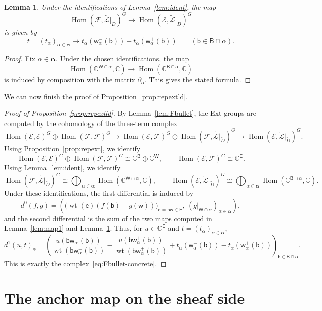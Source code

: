 \documentclass[dvipsnames,11pt]{article}
\newtheorem{lemma}[theorem]{Lemma}
\theoremstyle{definition}
\newcommand{\wt}{\operatorname{wt}}
\newcommand{\C}{{\mathbb C}}
\def\B{\mathsf B}
\def\W{\mathsf W}
\def\w{\mathsf w}
\def\b{\mathsf b}
\def\e{\mathsf e}
\def\E{\mathsf E}
\def\zz{\bm \alpha}
\def\cale{\mathcal E}
\def\calf{\mathcal F}
\DeclareMathOperator{\Hom}{Hom}
\begin{document}
\begin{lemma}\label{lem:map2}
Under the identifications of Lemma~\ref{lem:ident}, the map
\[
\Hom(\calf,\widetilde{\mathcal L}|_{\widetilde D})^G
\rightarrow
\Hom(\cale,\widetilde{\mathcal L}|_{\widetilde D})^G
\]
is given by
\[
t=(t_\alpha)_{\alpha\in\zz}
\mapsto
t_\alpha(\w_\alpha^{-}(\b))-t_\alpha(\w_\alpha^{+}(\b))
\qquad (\b\in\B\cap\alpha).
\]
\end{lemma}

\begin{proof}
Fix \(\alpha\in\zz\). Under the chosen identifications, the map
\[
\Hom(\C^{\W\cap\alpha},\C)\rightarrow \Hom(\C^{\B\cap\alpha},\C)
\]
is induced by composition with the matrix \(\partial_\alpha\). This gives the stated formula.
\end{proof}

We can now finish the proof of Proposition~\ref{prop:repextld}.

\begin{proof}[Proof of Proposition~\ref{prop:repextld}]
By Lemma~\ref{lem:Fbullet}, the Ext groups are computed by the cohomology of the three-term complex
\[
\Hom(\cale,\cale)^G\oplus\Hom(\calf,\calf)^G
\rightarrow
\Hom(\cale,\calf)^G\oplus\Hom(\calf,\widetilde{\mathcal L}|_{\widetilde D})^G
\rightarrow
\Hom(\cale,\widetilde{\mathcal L}|_{\widetilde D})^G.
\]
Using Proposition~\ref{prop:repext}, we identify
\[
\Hom(\cale,\cale)^G\oplus\Hom(\calf,\calf)^G \cong \C^\B\oplus \C^\W,
\qquad
\Hom(\cale,\calf)^G\cong \C^\E.
\]
Using Lemma~\ref{lem:ident}, we identify
\[
\Hom(\calf,\widetilde{\mathcal L}|_{\widetilde D})^G
\cong
\bigoplus_{\alpha\in\zz}\Hom(\C^{\W\cap\alpha},\C),
\qquad
\Hom(\cale,\widetilde{\mathcal L}|_{\widetilde D})^G
\cong
\bigoplus_{\alpha\in\zz}\Hom(\C^{\B\cap\alpha},\C).
\]
Under these identifications, the first differential is induced by
\[
d^{0}(f,g)
=
\left(
\bigl(\wt(\e)(f(\b)-g(\w))\bigr)_{\e=\b\w\in\E},
\ (g|_{\W\cap\alpha})_{\alpha\in\zz}
\right),
\]
and the second differential is the sum of the two maps computed in Lemma~\ref{lem:map1} and Lemma~\ref{lem:map2}. Thus, for \(u\in\C^\E\) and \(t=(t_\alpha)_{\alpha\in\zz}\),
\[
d^{1}(u,t)_\alpha
=
\left(
\frac{u(\b \w_\alpha^{-}(\b))}{\wt(\b \w_\alpha^{-}(\b))}
-
\frac{u(\b \w_\alpha^{+}(\b))}{\wt(\b \w_\alpha^{+}(\b))}
+
t_\alpha(\w_\alpha^{-}(\b))
-
t_\alpha(\w_\alpha^{+}(\b))
\right)_{\b\in \B\cap\alpha}.
\]
This is exactly the complex~\eqref{eq:Fbullet-concrete}.
\end{proof}

\section{The anchor map on the sheaf side}
\label{sec:anchor_sheaf}
\end{document}
